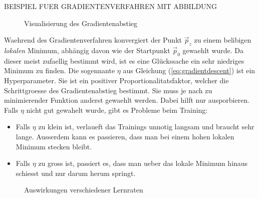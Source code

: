 \documentclass[../main]{subfiles}
\begin{document}
BEISPIEL FUER GRADIENTENVERFAHREN MIT ABBILDUNG

\begin{figure}[h!]
  \centering

  \caption{Visualisierung des Gradientenabstieg}
\end{figure}

Waehrend des Gradientenverfahren konvergiert der Punkt $\vec{p}_z$ zu einem belibigen \textit{lokalen} Minimum, abhängig davon wie der Startpunkt $\vec{p}_0$ gewaehlt wurde.
Da dieser meist zufaellig bestimmt wird, ist es eine Glückssache ein sehr niedriges Minimum zu finden.
\para{}
Die sogennante  $\eta$ aus Gleichung (\ref{eq:gradientdescent}) ist ein Hyperparameter.
Sie ist ein positiver Proportionalitatsfaktor, welcher die Schrittgroesse des Gradientenabstieg bestimmt. Sie muss je nach zu minimierender Funktion anderst gewaehlt werden.
Dabei hilft nur ausporbieren. Falls $\eta$ nicht gut gewahelt wurde, gibt es Probleme beim Training:
\begin{itemize}
\item{Falls $\eta$ zu klein ist, verlaueft das Trainings unnotig langsam und braucht sehr lange.
    Ausserdem kann es passieren, dass man bei einem hohen lokalen Minimum stecken bleibt.}

\item{Falls $\eta$ zu gross ist, passiert es, dass man ueber das lokale Minimum hinaus schiesst und nur darum herum springt.}
\end{itemize}

\begin{figure}[h!]
  \centering
  \caption{Auswirkungen verschiedener Lernraten}
\end{figure}
\end{document}
